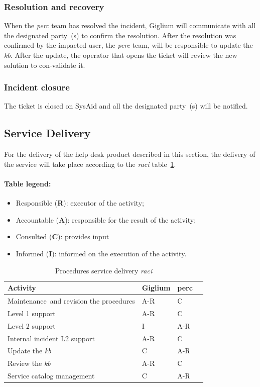 \subsubsection{Resolution and recovery}
When the \textit{\gls{perc}} team has resolved the incident, Giglium will communicate with all the designated party~(s) to confirm the resolution. After the resolution was confirmed by the impacted user, the \textit{\gls{perc}} team, will be responsible to update the \textit{\gls{kb}}. After the update, the operator that opens the ticket will review the new solution to con-validate it.

\subsubsection{Incident closure}
The ticket is closed on SysAid and all the designated party~(s) will be notified.

\subsection{Service Delivery}
For the delivery of the help desk product described in this section, the delivery of the
service will take place according to the \textit{\gls{raci}} table~\ref{tab:p_sd_raci}.

\paragraph{Table legend:}
\begin{itemize}
	\item Responsible (\textbf{R}): executor of the activity;
	\item Accountable (\textbf{A}): responsible for the result of the activity;
	\item Consulted (\textbf{C}): provides input
	\item Informed (\textbf{I}): informed on the execution of the activity.
\end{itemize}

\begin{table}[H]
	\centering
	\begin{tabular}{|l|l|l|l|} 
		\hline
		\textbf{Activity} & \textbf{Giglium} & \textbf{\gls{perc}}   \\
		\hline
		Maintenance and revision the procedures & A-R  &  C  \\
		\hline
		Level 1 support & A-R & C \\
		\hline
		Level 2 support & I & A-R \\
		\hline
		Internal incident L2 support & A-R & C \\
		\hline
		Update the \textit{\gls{kb}} & C & A-R\\
		\hline
		Review the \textit{\gls{kb}} & A-R & C\\
		\hline		
		Service catalog management & C & A-R \\
		\hline
	\end{tabular}
	\caption{Procedures service delivery \textit{\gls{raci}}}\label{tab:p_sd_raci}
\end{table}